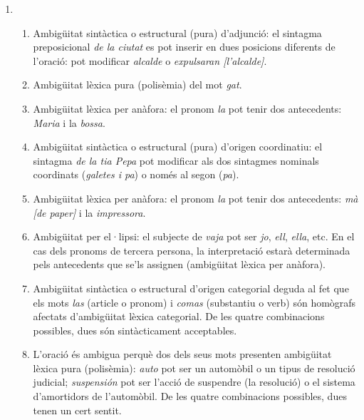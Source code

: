 \begin{enumerate}\item \begin{enumerate}
      \item Ambigüitat sintàctica o estructural (pura) d'adjunció: el sintagma
        preposicional \emph{de la ciutat} es pot inserir en dues
        posicions diferents de l'oració: pot modificar \emph{alcalde}
        o \emph{expulsaran [l'alcalde]}.
      \item Ambigüitat lèxica pura (polisèmia) del mot \emph{gat}.
      \item Ambigüitat lèxica per anàfora: el pronom \emph{la}
        pot tenir dos antecedents: \emph{Maria} i la \emph{bossa}.
      \item Ambigüitat sintàctica o estructural (pura) d'origen
        coordinatiu: el sintagma \emph{de la tia Pepa} pot modificar
        als dos sintagmes nominals coordinats (\emph{galetes i pa}) o
        només al segon (\emph{pa}).
      \item Ambigüitat lèxica per anàfora: el pronom \emph{la}
        pot tenir dos antecedents: \emph{mà [de paper]} i la \emph{impressora}.
      \item Ambigüitat per el·lipsi: el subjecte de \emph{vaja} pot
        ser \emph{jo}, \emph{ell}, \emph{ella}, etc. En el cas dels
        pronoms de tercera persona, la interpretació estarà
        determinada pels antecedents que se'ls assignen (ambigüitat
        lèxica per anàfora).
      \item Ambigüitat sintàctica o estructural d'origen categorial
        deguda al fet que els mots \emph{las} (article o pronom) i
        \emph{comas} (substantiu o verb) són homògrafs afectats
        d'ambigüitat lèxica categorial. De les quatre combinacions
        possibles, dues són sintàcticament acceptables.
      \item         L'oració és ambigua perquè dos dels seus mots presenten
        ambigüitat lèxica pura (polisèmia): \emph{auto} pot ser un
        automòbil o un tipus de resolució judicial; \emph{suspensión}
        pot ser l'acció de suspendre (la resolució) o el sistema
        d'amortidors de l'automòbil. De les quatre combinacions
        possibles, dues tenen un cert sentit.
        

\end{enumerate}
\end{enumerate}
